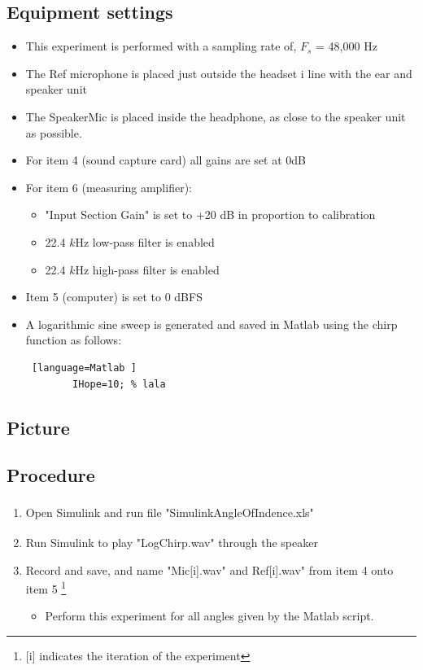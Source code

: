 \subsection{Equipment settings}
\begin{itemize}
	\item This experiment is performed with a sampling rate of, $F_{s}$ = 48,000 Hz
	\item The Ref microphone is placed just outside the headset i line with the ear and speaker unit
	\item The SpeakerMic is placed inside the headphone, as close to the speaker unit as possible. 
	\item For item 4 (sound capture card) all gains are set at 0dB		
	\item For item 6 (measuring amplifier):
	\begin{itemize}
		\item "Input Section Gain" is set to +20 dB in proportion to calibration
		\item 22.4 $k$Hz low-pass filter is enabled
		\item 22.4 $k$Hz high-pass filter is enabled 
	\end{itemize}
	\item Item 5 (computer) is set to 0 dBFS
	\item A logarithmic sine sweep is generated and saved in Matlab using the chirp function as follows:
	\begin{lstlisting} [language=Matlab	]
		IHope=10; % lala
	\end{lstlisting}
\end{itemize}

\subsection{Picture}



\subsection{Procedure}
\begin{enumerate}
	\item Open Simulink\textsuperscript{\textregistered} and run file "SimulinkAngleOfIndence.xls"
	\item Run Simulink\textsuperscript{\textregistered} to play "LogChirp.wav" through the speaker
	\item Record and save, and name "Mic[i].wav" and Ref[i].wav" from item 4 onto item 5 \footnote{[i] indicates the iteration of the experiment}
	\begin{itemize}
		\item[] Perform this experiment for all angles given by the Matlab script. 
	\end{itemize}
\end{enumerate}


